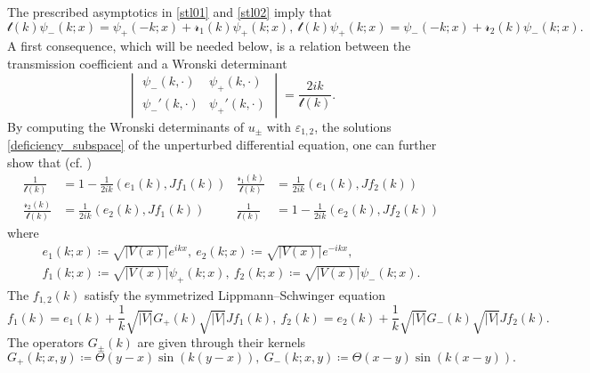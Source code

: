 The prescribed asymptotics in \eqref{stl01} and \eqref{stl02} imply that
\begin{equation}\label{stl04}
  \mathscr{t}(k)\psi_-(k;x) = \psi_+(-k;x) + \mathscr{r}_1(k) \psi_+(k;x) ,\
  \mathscr{t}(k)\psi_+(k;x) = \psi_-(-k;x) + \mathscr{r}_2(k) \psi_-(k;x) .
\end{equation}
A first consequence, which will be needed below, is a relation between the transmission coefficient and
a Wronski determinant
\begin{equation}\label{wronski01}
\begin{vmatrix}
  \psi_-(k,\cdot)  & \psi_+(k,\cdot) \\
  \psi_-'(k,\cdot) & \psi_+'(k,\cdot)
\end{vmatrix}
  = \frac{2ik}{\mathscr{t}(k)} .
\end{equation}
By computing the Wronski determinants of $u_\pm$ with $\varepsilon_{1,2}$, the solutions \eqref{deficiency_subspace}
of the unperturbed differential equation, one can further show that (cf. \cite[pp. 145,146]{DeiftTrubowitz1979})
\begin{equation}\label{s-matrix01}
\begin{aligned}
  \frac{1}{\mathscr{t}(k)}   & = 1 - \frac{1}{2ik} (e_1(k), Jf_1(k))
                & \frac{\mathscr{r}_1(k)}{\mathscr{t}(k)} & = \frac{1}{2ik} (e_1(k), Jf_2(k))\\
  \frac{\mathscr{r}_2(k)}{\mathscr{t}(k)} & = \frac{1}{2ik} ( e_2(k), Jf_1(k))
                & \frac{1}{\mathscr{t}(k)}   & = 1 - \frac{1}{2ik} ( e_2(k), Jf_2(k))
\end{aligned}
\end{equation}
where
\begin{gather*}
  e_1(k;x)\coloneqq\sqrt{|V(x)|}e^{ikx},\ e_2(k;x)\coloneqq\sqrt{|V(x)|}e^{-ikx},\\
  f_1(k;x)\coloneqq\sqrt{|V(x)|}\psi_+(k;x),\ f_2(k;x)\coloneqq\sqrt{|V(x)|}\psi_-(k;x) .
\end{gather*}
The $f_{1,2}(k)$ satisfy the symmetrized Lippmann--Schwinger equation
\begin{equation}\label{lippmann_schwinger_sym}
  f_1(k) =  e_1(k) + \frac{1}{k} \sqrt{|V|}G_+(k)\sqrt{|V|}J f_1(k),\
  f_2(k) =  e_2(k) + \frac{1}{k} \sqrt{|V|}G_-(k)\sqrt{|V|}J f_2(k) .
\end{equation}
The operators $G_\pm(k)$ are given through their kernels
\begin{equation*}
   G_+(k;x,y) \coloneqq \Theta(y-x) \sin(k(y-x)),\
   G_-(k;x,y) \coloneqq \Theta(x-y) \sin(k(x-y)) .
\end{equation*}
